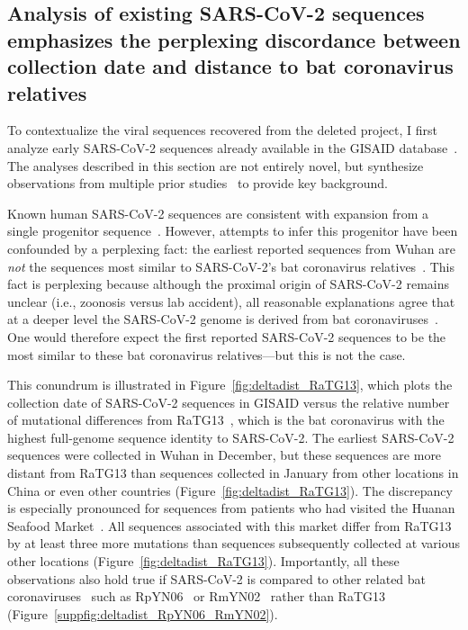 \documentclass[9pt,twocolumn,twoside]{gsajnl_modified}
\begin{document}
\subsection{Analysis of existing SARS-CoV-2 sequences emphasizes the perplexing discordance between collection date and distance to bat coronavirus relatives}
To contextualize the viral sequences recovered from the deleted project, I first analyze early SARS-CoV-2 sequences already available in the GISAID database~\citep{shu2017gisaid}.
The analyses described in this section are not entirely novel, but synthesize observations from multiple prior studies~\citep{kumar2021evolutionary,pekar2021timing,rambaut2020dynamic,forster2020phylogenetic,pipes2021assessing} to provide key background.

Known human SARS-CoV-2 sequences are consistent with expansion from a single progenitor sequence~\citep{kumar2021evolutionary,pekar2021timing,rambaut2020dynamic,forster2020phylogenetic,pipes2021assessing}.
However, attempts to infer this progenitor have been confounded by a perplexing fact: the earliest reported sequences from Wuhan are \emph{not} the sequences most similar to SARS-CoV-2's bat coronavirus relatives~\citep{pipes2021assessing}.
This fact is perplexing because although the proximal origin of SARS-CoV-2 remains unclear (i.e., zoonosis versus lab accident), all reasonable explanations agree that at a deeper level the SARS-CoV-2 genome is derived from bat coronaviruses~\citep{lytras2021exploring}.
One would therefore expect the first reported SARS-CoV-2 sequences to be the most similar to these bat coronavirus relatives---but this is not the case.

This conundrum is illustrated in Figure~\ref{fig:deltadist_RaTG13}, which plots the collection date of SARS-CoV-2 sequences in GISAID versus the relative number of mutational differences from RaTG13~\citep{zhou2020pneumonia}, which is the bat coronavirus with the highest full-genome sequence identity to SARS-CoV-2.
The earliest SARS-CoV-2 sequences were collected in Wuhan in December, but these sequences are more distant from RaTG13 than sequences collected in January from other locations in China or even other countries (Figure~\ref{fig:deltadist_RaTG13}).
The discrepancy is especially pronounced for sequences from patients who had visited the Huanan Seafood Market~\citep{WHO2021origins}.
All sequences associated with this market differ from RaTG13 by at least three more mutations than sequences subsequently collected at various other locations (Figure~\ref{fig:deltadist_RaTG13}).
Importantly, all these observations also hold true if SARS-CoV-2 is compared to other related bat coronaviruses~\citep{lytras2021exploring} such as RpYN06~\citep{zhou2021identification} or RmYN02~\citep{zhou2020novel} rather than RaTG13 (Figure~\ref{suppfig:deltadist_RpYN06_RmYN02}).
\end{document}
